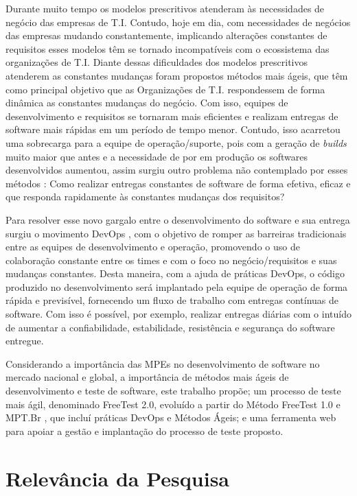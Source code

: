 Durante muito tempo os modelos prescritivos atenderam às necessidades de negócio das empresas de T.I. Contudo, hoje em dia, com necessidades de negócios das empresas mudando constantemente, implicando alterações constantes de requisitos esses modelos têm se tornado incompatíveis com o ecossistema das organizações de T.I. Diante dessas dificuldades dos modelos prescritivos atenderem as constantes mudanças foram propostos métodos mais ágeis, que têm como principal objetivo que as Organizações de T.I. respondessem de forma dinâmica as constantes mudanças do negócio. Com isso, equipes de desenvolvimento e requisitos se tornaram mais eficientes e realizam entregas de software mais rápidas em um período de tempo menor. Contudo, isso acarretou uma sobrecarga para a equipe de operação/suporte, pois com a geração de \textit{builds} muito maior que antes e a necessidade de por em produção os softwares desenvolvidos aumentou, assim surgiu outro problema não contemplado por esses métodos \cite{BRAGA2015}: Como realizar entregas constantes de software de forma efetiva, eficaz e que responda rapidamente às constantes mudanças dos requisitos?

Para resolver esse novo gargalo entre o desenvolvimento do software e sua entrega surgiu o movimento DevOps \cite{Debois2008}, com o objetivo de romper as barreiras tradicionais entre as equipes de desenvolvimento e operação, promovendo o uso de colaboração constante entre os times e com o foco no negócio/requisitos e suas mudanças constantes. Desta maneira, com a ajuda de práticas DevOps, o código produzido no desenvolvimento será implantado pela equipe de operação de forma rápida e previsível, fornecendo um fluxo de trabalho com entregas contínuas de software. Com isso é possível, por exemplo, realizar entregas diárias com o intuído de aumentar a confiabilidade, estabilidade, resistência e segurança do software entregue.

Considerando a importância das MPEs no desenvolvimento de software no mercado nacional e global, a importância de métodos mais ágeis de desenvolvimento e teste de software, este trabalho propõe; um processo de teste mais ágil, denominado FreeTest 2.0, evoluído a partir do Método FreeTest 1.0 \cite{Camilo-junior2012} e MPT.Br \cite{GuiaMPTbr}, que incluí práticas DevOps e Métodos Ágeis; e uma ferramenta web para apoiar a gestão e implantação do processo de teste proposto.

\section{Relevância da Pesquisa}

